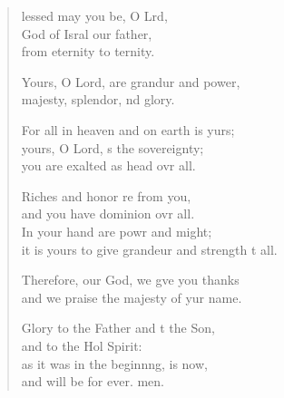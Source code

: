 \settowidth{\versewidth}{it is yours to give grandeur and strength to all.}
\begin{verse}%
  \begin{patverse}
    lessed may you be, O Lrd,\Flex\\
God of Isral our father,\Med\\
from eternity to ternity.

Yours, O Lord, are grandur and power,\Med\\
majesty, splendor, nd glory.

For all in heaven and on earth is yurs;\Flex\\
yours, O Lord, \pointup{\i}s the sovereignty;\Med\\
you are exalted as head ovr all.

Riches and honor re from you,\Med\\
and you have dominion ovr all.\\
In your hand are powr and might;\Med\\
it is yours to give grandeur and strength t all.

Therefore, our God, we g\pointup{\i}ve you thanks\Med\\
and we praise the majesty of yur name.

Glory to the Father and t the Son,\Med\\
    and to the Hol Spirit:\\
as it was in the beginn\pointup{\i}ng, is now,\Med\\
    and will be for ever. men.
  \end{patverse}
\end{verse}
